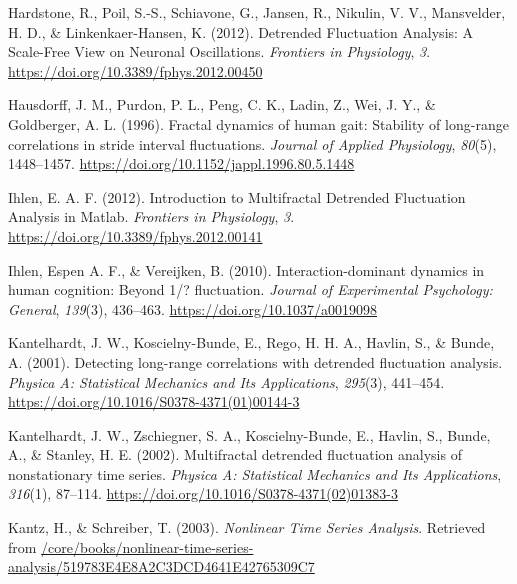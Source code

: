 \documentclass[
  man]{apa6}
\newlength{\cslhangindent}
\newlength{\cslentryspacingunit} %
\newenvironment{CSLReferences}[2] %
 {%
  \setlength{\parindent}{0pt}
  \ifodd #1
  \let\oldpar\par
  \def\par{\hangindent=\cslhangindent\oldpar}
  \fi
  \setlength{\parskip}{#2\cslentryspacingunit}
 }%
 {}
\begin{document}
\begin{CSLReferences}{1}{0}
\leavevmode{}%
Hardstone, R., Poil, S.-S., Schiavone, G., Jansen, R., Nikulin, V. V., Mansvelder, H. D., \& Linkenkaer-Hansen, K. (2012). Detrended {Fluctuation} {Analysis}: {A} {Scale}-{Free} {View} on {Neuronal} {Oscillations}. \emph{Frontiers in Physiology}, \emph{3}. \url{https://doi.org/10.3389/fphys.2012.00450}

\leavevmode{}%
Hausdorff, J. M., Purdon, P. L., Peng, C. K., Ladin, Z., Wei, J. Y., \& Goldberger, A. L. (1996). Fractal dynamics of human gait: Stability of long-range correlations in stride interval fluctuations. \emph{Journal of Applied Physiology}, \emph{80}(5), 1448--1457. \url{https://doi.org/10.1152/jappl.1996.80.5.1448}

\leavevmode{}%
Ihlen, E. A. F. (2012). Introduction to {Multifractal} {Detrended} {Fluctuation} {Analysis} in {Matlab}. \emph{Frontiers in Physiology}, \emph{3}. \url{https://doi.org/10.3389/fphys.2012.00141}

\leavevmode{}%
Ihlen, Espen A. F., \& Vereijken, B. (2010). Interaction-dominant dynamics in human cognition: Beyond 1/{\textflorin}? fluctuation. \emph{Journal of Experimental Psychology: General}, \emph{139}(3), 436--463. \url{https://doi.org/10.1037/a0019098}

\leavevmode{}%
Kantelhardt, J. W., Koscielny-Bunde, E., Rego, H. H. A., Havlin, S., \& Bunde, A. (2001). Detecting long-range correlations with detrended fluctuation analysis. \emph{Physica A: Statistical Mechanics and Its Applications}, \emph{295}(3), 441--454. \url{https://doi.org/10.1016/S0378-4371(01)00144-3}

\leavevmode{}%
Kantelhardt, J. W., Zschiegner, S. A., Koscielny-Bunde, E., Havlin, S., Bunde, A., \& Stanley, H. E. (2002). Multifractal detrended fluctuation analysis of nonstationary time series. \emph{Physica A: Statistical Mechanics and Its Applications}, \emph{316}(1), 87--114. \url{https://doi.org/10.1016/S0378-4371(02)01383-3}

\leavevmode{}%
Kantz, H., \& Schreiber, T. (2003). \emph{Nonlinear Time Series Analysis}. Retrieved from \href{https:///core/books/nonlinear-time-series-analysis/519783E4E8A2C3DCD4641E42765309C7}{/core/books/nonlinear-time-series-analysis/519783E4E8A2C3DCD4641E42765309C7}


\end{CSLReferences}
\end{document}
